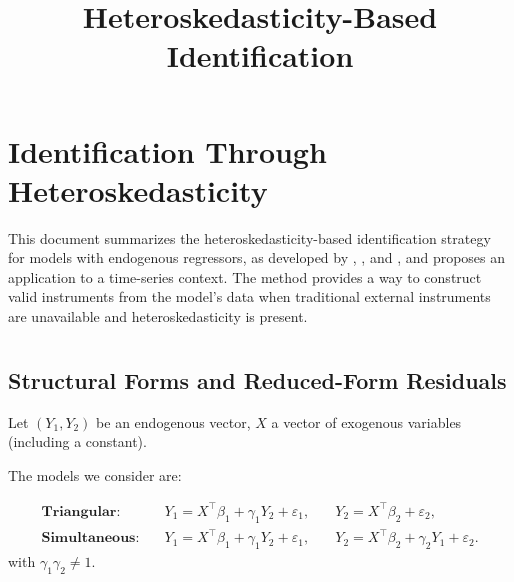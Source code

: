 \usepackage{enumitem}
\usepackage{hyperref}


\makeatletter
\newcommand{\E}{\mathbb{E}}
\newcommand{\cov}{\operatorname{Cov}}
\newcommand{\corr}{\operatorname{Corr}}
\newcommand{\var}{\operatorname{Var}}
\newcommand{\plim}{\operatorname*{plim}}
\newcommand{\argmin}{\operatorname*{arg\,min}}

\theoremstyle{plain}
\newtheorem{theorem}{Theorem}\newtheorem{remark}{Remark}
\newtheorem{cor}{Corollary}[section]

\newcommand{\T}{^{\top}}
\makeatother

\title{Heteroskedasticity-Based Identification}
\author{}
\date{}



\maketitle

\section{Identification Through Heteroskedasticity}

This document summarizes the heteroskedasticity-based identification
strategy for models with endogenous regressors, as developed by \textcite{lewbel2012},
\textcite{klein2010estimating}, \textcite{rigobon2003} and \textcite{prono2014}, and proposes an
application to a time-series context. The method provides a way to
construct valid instruments from the model's data when traditional
external instruments are unavailable and heteroskedasticity is present.

\section[Lewbel (2012)]{\textcite{lewbel2012}}

\subsection{Structural Forms and Reduced-Form Residuals}

Let $(Y_{1},Y_{2})$ be an endogenous vector, $X$ a vector of exogenous
variables (including a constant).

The models we consider are:

\begin{align*}
\textbf{Triangular:}\quad & Y_{1}=X\T\beta_{1}+\gamma_{1}Y_{2}+\varepsilon_{1}, & \quad Y_{2}=X\T\beta_{2}+\varepsilon_{2},\\[3pt]
\textbf{Simultaneous:}\quad & Y_{1}=X\T\beta_{1}+\gamma_{1}Y_{2}+\varepsilon_{1}, & \quad Y_{2}=X\T\beta_{2}+\gamma_{2}Y_{1}+\varepsilon_{2}.
\end{align*}
with $\gamma_{1}\gamma_{2}\neq1$.

